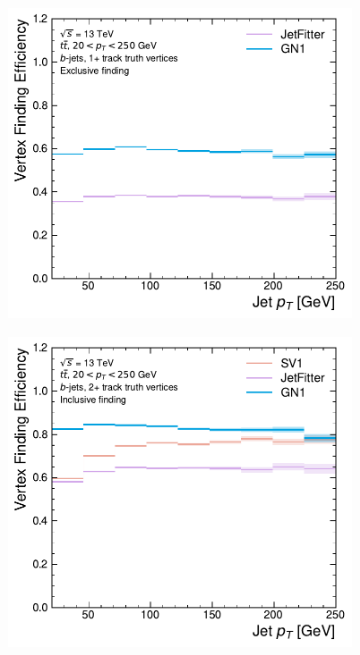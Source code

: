 \begin{figure}[!htbp]
    \centering
    \begin{subfigure}[b]{0.48\textwidth}
        \centering
        \includegraphics[width=\textwidth]{chapters/gnn_tagger/figs/results/tracks/ttbar/ttbar_bjet_vert_eff_1+_track_excl.pdf}
    \end{subfigure}
    \quad
    \begin{subfigure}[b]{0.48\textwidth}
        \centering
        \includegraphics[width=\textwidth]{chapters/gnn_tagger/figs/results/tracks/ttbar/ttbar_bjet_vert_eff_2+_track_incl.pdf}

\end{subfigure}
\end{figure}

